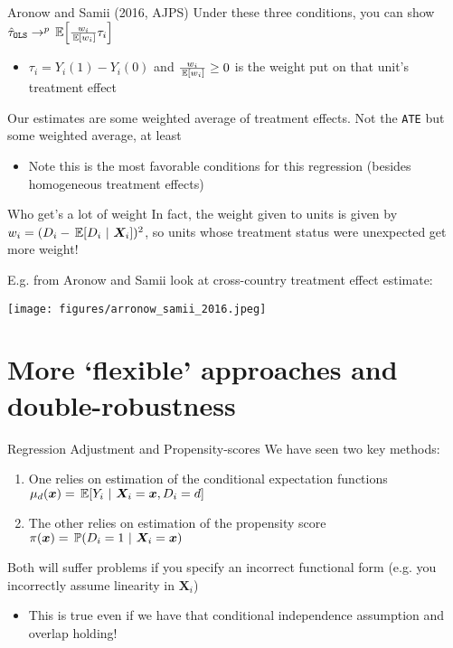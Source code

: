 \documentclass[aspectratio=169,t,11pt,table]{beamer}
\begin{document}
\begin{frame}{Aronow and Samii (2016, AJPS)}
  Under these three conditions, you can show $\hat{\tau}_{\texttt{OLS}} \to^p \expec{\frac{w_i}{\expec{w_i}} \tau_i}$
  \begin{itemize}
    \item $\tau_i = Y_i(1) - Y_i(0)$ and $\frac{w_i}{\expec{w_i}} \geq 0$ is the weight put on that unit's treatment effect
  \end{itemize}

  Our estimates are some weighted average of treatment effects. Not the \texttt{ATE} but some weighted average, at least
  \begin{itemize}
    \item Note this is the most favorable conditions for this regression (besides homogeneous treatment effects)
  \end{itemize}
\end{frame}

\begin{frame}{Who get's a lot of weight}
  In fact, the weight given to units is given by $w_i = (D_i - \expec{D_i}{\bm{X}_i})^2$, so units whose treatment status were unexpected get more weight!

  \pause
  E.g. from Aronow and Samii look at cross-country treatment effect estimate:
  \begin{center}  
    \texttt{[image: figures/arronow\_samii\_2016.jpeg]}
  \end{center}
\end{frame}



\section{More `flexible' approaches and double-robustness}

\begin{frame}{Regression Adjustment and Propensity-scores}
  We have seen two key methods:
  \begin{enumerate}
    \item One relies on estimation of the conditional expectation functions $\mu_d(\bm{x}) = \expec{Y_i}{\bm{X}_i = \bm{x}, D_i = d}$
    
    \item The other relies on estimation of the propensity score $\pi(\bm{x}) = \prob{D_i = 1}{\bm{X}_i = \bm{x}}$
  \end{enumerate}

  \bigskip
  Both will suffer problems if you specify an incorrect functional form (e.g. you incorrectly assume linearity in $\bm{X}_i$)
  \begin{itemize}
    \item This is true even if we have that conditional independence assumption and overlap holding! 
  \end{itemize}
\end{frame}
\end{document}
